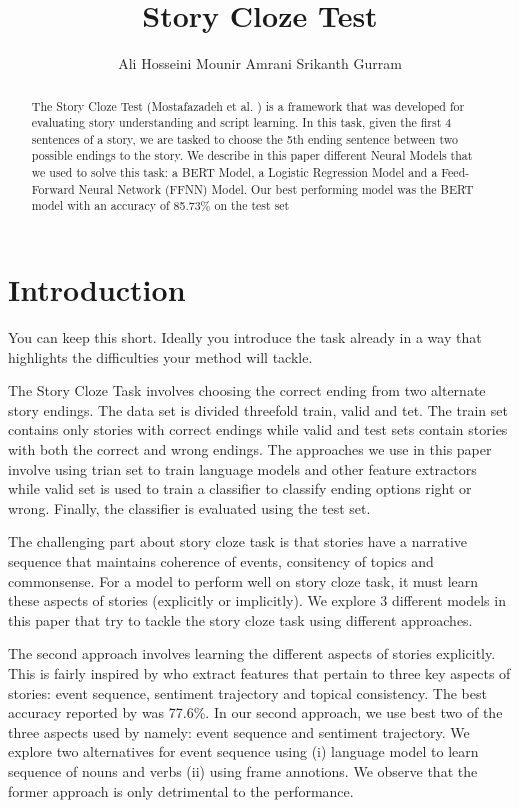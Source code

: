 \documentclass{article}
\title{Story Cloze Test}
\author{Ali Hosseini \qquad Mounir Amrani \qquad Srikanth Gurram}
\begin{document}

\maketitle

\begin{abstract}
The Story Cloze Test (Mostafazadeh et al. \cite{cloze}) is a framework that was developed for evaluating story understanding and script learning. In this task, given the first 4 sentences of a story, we are tasked to choose the 5th ending sentence between two possible endings to the story.
We describe in this paper different Neural Models that we used to solve this task: a BERT Model, a Logistic Regression Model and a Feed-Forward Neural Network (FFNN) Model. Our best performing model was the BERT model with an accuracy of 85.73\% on the test set
\end{abstract}

\section{Introduction}

You can keep this short. Ideally you introduce the task already in a way that highlights the difficulties your method will tackle.

The Story Cloze Task involves choosing the correct ending from two alternate story endings. The data set is divided threefold train, valid and tet. The train set contains only stories with correct endings while valid and test sets contain stories with both the correct and wrong endings. The approaches we use in this paper involve using trian set to train language models and other feature extractors while valid set is used to train a classifier to classify ending options right or wrong. Finally, the classifier is evaluated using the test set.

The challenging part about story cloze task is that stories have a narrative sequence that maintains coherence of events, consitency of topics and commonsense. For a model to perform well on story cloze task, it must learn these aspects of stories (explicitly or implicitly). We explore 3 different models in this paper that try to tackle the story cloze task using different approaches.

The second approach involves learning the different aspects of stories explicitly. This is fairly inspired by \cite{hcm} who extract features that pertain to three key aspects of stories: event sequence, sentiment trajectory and topical consistency. The best accuracy reported by \cite{hcm} was 77.6\%. In our second approach, we use best two of the three aspects used by \cite{hcm} namely: event sequence and sentiment trajectory. We explore two alternatives for event sequence using (i) language model to learn sequence of nouns and verbs (ii) using frame annotions. We observe that the former approach is only detrimental to the performance.
\end{document}
